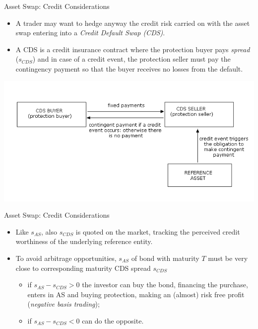\documentclass{beamer}
\begin{document}
\begin{frame}{Asset Swap: Credit Considerations}
	\begin {itemize}
	\item A trader may want to hedge anyway the credit risk carried on with the asset swap entering into a \emph{Credit Default Swap (CDS)}.
	\item A CDS is a credit insurance contract where the protection buyer pays \emph{spread} ($s_{CDS}$) and in case of a credit event, the protection seller must pay the contingency payment so that the buyer receives no losses from the default.
	\end{itemize}
\begin{center}
\includegraphics[width=0.7\linewidth]{images/credit-default-swaps}
\end{center}
\end{frame}

\begin{frame}{Asset Swap: Credit Considerations}
	\begin {itemize}
	\item Like $s_{AS}$, also $s_{CDS}$ is quoted on the market, tracking the perceived credit worthiness of the underlying reference entity.
	\item To avoid arbitrage opportunities, $s_{AS}$ of bond with maturity $T$ must be very close to corresponding maturity CDS spread $s_{CDS}$
	\begin{itemize}
		\item if $s_{AS} - s_{CDS} > 0$ the investor can buy the bond, financing the purchase, enters in AS and buying protection, making an (almost) risk free profit (\emph{negative basis trading});
		\item if $s_{AS} - s_{CDS} < 0$ can do the opposite.
	\end{itemize}
	\end{itemize}
\end{frame}
\end{document}
